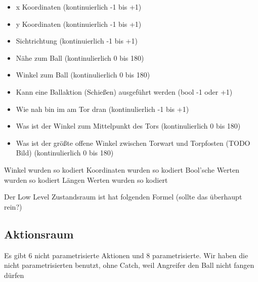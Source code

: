             \begin{itemize}
                \item x Koordinaten (kontinuierlich -1 bis +1)
                \item y Koordinaten (kontinuierlich -1 bis +1)
                \item Sichtrichtung (kontinuierlich -1 bis +1)
                \item Nähe zum Ball (kontinulierlich 0 bis 180)
                \item Winkel zum Ball (kontinulierlich 0 bis 180)
                \item Kann eine Ballaktion (Schießen) ausgeführt werden (bool -1 oder +1)
                \item Wie nah bin im am Tor dran (kontinulierlich -1 bis +1)
                \item Was ist der Winkel zum Mittelpunkt des Tors (kontinulierlich 0 bis 180)
                \item Was ist der größte offene Winkel zwischen Torwart und Torpfosten (TODO Bild) (kontinulierlich 0 bis 180)
            \end{itemize}

            Winkel wurden so kodiert
            Koordinaten wurden so kodiert
            Bool'sche Werten wurden so kodiert
            Längen Werten wurden so kodiert

            Der Low Level Zustandsraum ist hat folgenden Formel (sollte das überhaupt rein?)
        \subsection{Aktionsraum}
            Es gibt 6 nicht parametrisierte Aktionen und 8 parametrisierte. Wir haben die nicht parametrisierten benutzt, ohne Catch, weil Angreifer den Ball nicht fangen dürfen

